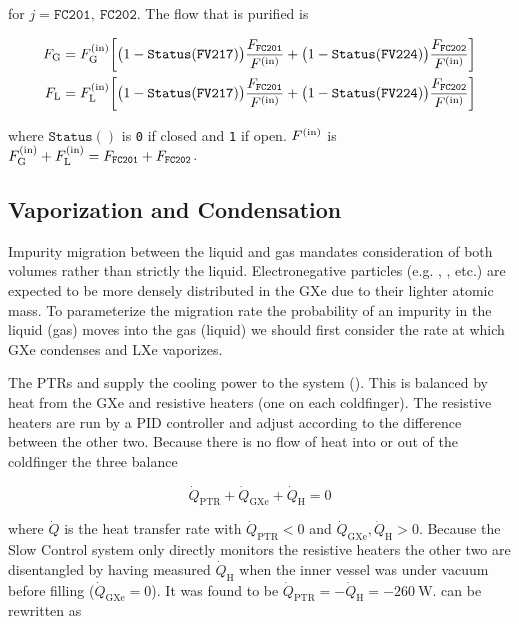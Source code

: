 \noindent for $j = \mathtt{FC201,\ FC202}$.  The flow that is purified is

\begin{subequations}
\begin{align}
F_{\mathrm{G}} &= F_{\mathrm{G}}^{(\mathrm{in})} \bigg[ \big(1 - \mathtt{Status(FV217)}\big) \frac{F_{\mathtt{FC201}}}{F^{(\mathrm{in})}} +
\big(1 - \mathtt{Status(FV224)}\big) \frac{F_{\mathtt{FC202}}}{F^{(\mathrm{in})}} \bigg]
\\
F_{\mathrm{L}} &= F_{\mathrm{L}}^{(\mathrm{in})} \bigg[ \big(1 - \mathtt{Status(FV217)}\big) \frac{F_{\mathtt{FC201}}}{F^{(\mathrm{in})}} +
\big(1 - \mathtt{Status(FV224)}\big) \frac{F_{\mathtt{FC202}}}{F^{(\mathrm{in})}} \bigg]
\end{align}
\end{subequations}

\noindent where $\mathtt{Status()}$ is \texttt{0} if closed and \texttt{1} if open.  $F^{(\mathrm{in})}$ is
$F_{\mathrm{G}}^{(\mathrm{in})} + F_{\mathrm{L}}^{(\mathrm{in})} = F_{\mathtt{FC201}} + F_{\mathtt{FC202}}$.



\subsection{Vaporization and Condensation}
\label{subsec:electron_lifetime_model_vap_and_cond}
Impurity migration between the liquid and gas mandates consideration of both volumes rather than strictly the liquid.  Electronegative
particles (e.g. , , etc.) are expected to be more densely distributed in the GXe due to their lighter atomic mass.  To
parameterize the migration rate the probability of an impurity in the liquid (gas) moves into the gas (liquid) we should first
consider the rate at which GXe condenses and LXe vaporizes.

The PTRs and  supply the cooling power to the system ().  This is balanced by heat from the GXe and
resistive heaters (one on each coldfinger).  The resistive heaters are run by a PID controller and adjust according to the difference
between the other two.  Because there is no flow of heat into or out of the coldfinger the three balance

\begin{equation}
\dot{Q}_{\mathrm{PTR}} + \dot{Q}_{\mathrm{GXe}} + \dot{Q}_{\mathrm{H}} = 0
\label{eq:electron_lifetime_model_vap_and_cond_heat_cons}
\end{equation}

\noindent where $\dot{Q}$ is the heat transfer rate with $\dot{Q}_{\mathrm{PTR}} < 0$ and
$\dot{Q}_{\mathrm{GXe}}, \dot{Q}_{\mathrm{H}} > 0$.  Because the Slow Control system only directly monitors the resistive heaters the
other two are disentangled by having measured $\dot{Q}_{\mathrm{H}}$ when the inner vessel was under vacuum before filling
($\dot{Q}_{\mathrm{GXe}} = 0$).  It was found
to be $\dot{Q}_{\mathrm{PTR}} = -\dot{Q}_{\mathrm{H}} = -260\ \mathrm{W}$.   can
be rewritten as

